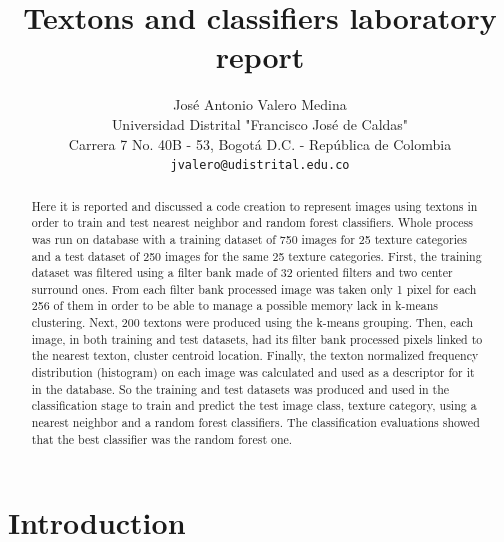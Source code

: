 \documentclass[10pt,twocolumn,letterpaper]{article}
\begin{document}
\title{Textons and classifiers laboratory report}

\author{José Antonio Valero Medina\\
Universidad Distrital "Francisco José de Caldas"\\
Carrera 7 No. 40B - 53, Bogotá D.C. - República de Colombia\\
{\tt\small jvalero@udistrital.edu.co}
}

\maketitle

\begin{abstract}
   Here it is reported and discussed a code creation to represent images using textons in order to train and test nearest neighbor and random forest classifiers. Whole process was run on database with a training dataset of 750 images for 25 texture categories and a test dataset of 250 images for the same 25 texture categories. First, the training dataset was filtered using a filter bank made of 32 oriented filters and two center surround ones.  From each filter bank processed image was taken only 1 pixel for each 256 of them in order to be able to manage a possible memory lack in k-means clustering.  Next, 200 textons were produced using the k-means grouping. Then, each image, in both training and test datasets, had its filter bank processed pixels linked to the nearest texton, \ie cluster centroid location. Finally, the texton normalized frequency distribution (histogram) on each image was calculated and used as a descriptor for it in the database. So the training and test datasets was produced and used in the classification stage to train and predict the test image class, \ie texture category, using a nearest neighbor and a random forest classifiers. The classification evaluations showed that the best classifier was the random forest one.
\end{abstract}

\section{Introduction}
\end{document}
